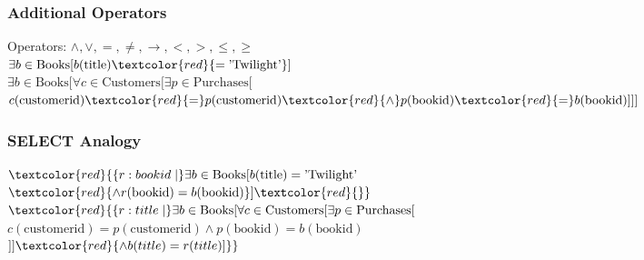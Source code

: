 \documentclass{beamer}
\begin{document}
\begin{frame}
  \frametitle{Additional Operators}

  Operators: $\land, \lor, =, \neq, \rightarrow, <, >, \leq, \geq$\\

  $\exists b \in \text{Books} [b(\text{title}) \textcolor{red}{= \text{'Twilight'}}]$\\

  $\exists b \in \text{Books} [\forall c \in \text{Customers} [ \exists p \in \text{Purchases} [$
  $c(\text{customerid}) \textcolor{red}{=} p(\text{customerid}) \textcolor{red}{\land}  p(\text{bookid}) \textcolor{red}{=} b(\text{bookid})] ] ]$\\
\end{frame}

\begin{frame}
  \frametitle{SELECT Analogy}
  $\textcolor{red}{\{r:bookid \mid }\exists b \in \text{Books} [b(\text{title}) = \text{'Twilight'}$ \\
  $\textcolor{red}{\land r(\text{bookid}) = b(\text{bookid})}]\textcolor{red}{\}}$\\

  $\textcolor{red}{\{ r:title \mid }\exists b \in \text{Books} [\forall c \in \text{Customers} [ \exists p \in \text{Purchases} [ $\\
  $c(\text{customerid}) = p(\text{customerid}) \land  p(\text{bookid}) = b(\text{bookid})$ \\
  $] ] \textcolor{red}{ \land b(title) = r(title)]\}}$
\end{frame}
\end{document}

